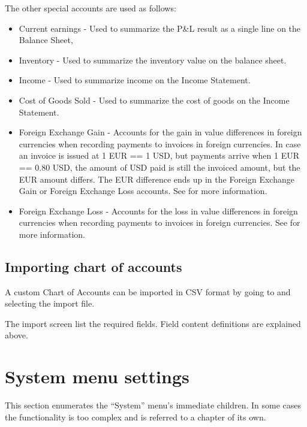 The other special accounts are used as follows:

\begin{itemize}
    \item Current earnings - Used to summarize the P\&L result as a single line on the Balance Sheet,
    \item Inventory - Used to summarize the inventory value on the balance sheet.
    \item Income - Used to summarize income on the Income Statement.
    \item Cost of Goods Sold - Used to summarize the cost of goods on the Income Statement.
    \item Foreign Exchange Gain - Accounts for the gain in value differences in foreign currencies when recording payments to invoices in foreign currencies.
    In case an invoice is issued at 1 EUR == 1 USD, but payments arrive when 1 EUR == 0.80 USD, the amount of USD paid is still the invoiced amount, but the EUR amount differs. 
    The EUR difference ends up in the Foreign Exchange Gain or Foreign Exchange Loss accounts. See  for more information.
    \item Foreign Exchange Loss - Accounts for the loss in value differences in foreign currencies when recording payments to invoices in foreign currencies. See  for more information.
\end{itemize}

\subsection{Importing chart of accounts}
\label{subsec-coa-importing}

A custom Chart of Accounts can be imported in CSV format by going to  and selecting the import file.

The import screen list the required fields. Field content definitions are explained above.

\section{System menu settings}
\label{sec-company-config-system-menu}

This section enumerates the ``System'' menu's immediate children. In some cases the
functionality is too complex and is referred to a chapter of its own.


